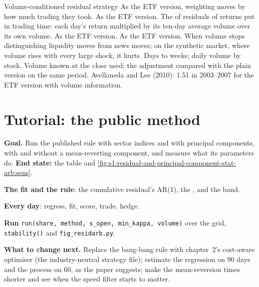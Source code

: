 \begin{strategyfile}{Volume-conditioned residual strategy}\label{strat:s1:residual-and-principal-component-stat-arb:volume}
 As the ETF version, weighting moves by how much trading they took.
 As the ETF version.
 The  of residuals of returns put in trading time: each day's return multiplied by its ten-day average volume over its own volume.
 As the ETF version.
 As the ETF version.
 When volume stops distinguishing liquidity moves from news moves; on the synthetic market, where volume rises with every large shock,
it hurts.
 Days to weeks; daily volume by stock.
 Volume known at the close used; the adjustment compared with the plain version on the same period.
 Avellaneda and Lee (2010): 1.51 in 2003--2007 for the ETF version with volume information.
\end{strategyfile}

\section{Tutorial: the public method}\label{tut:s1:residual-and-principal-component-stat-arb:tut}

\begin{tutorial}
\textbf{Goal.} Run the published rule with sector indices and with principal components, with and without a mean-reverting component, and measure what its
parameters do. \textbf{End state:} the table and \cref{fig:s1:residual-and-principal-component-stat-arb:sens}.
\begin{tutsteps}
\item \textbf{The fit and the rule}: the cumulative residual's AR(1), the , and the band.
\label{lst:s1:residual-and-principal-component-stat-arb:fit}
\item \textbf{Every day}: regress, fit, score, trade, hedge.
\label{lst:s1:residual-and-principal-component-stat-arb:loop}
\item \textbf{Run} \texttt{run(share, method, s\_open, min\_kappa, volume)} over the grid, \texttt{stability()} and \texttt{fig\_residarb.py}.
\end{tutsteps}
\textbf{What to change next.} Replace the bang-bang rule with chapter~2's cost-aware optimiser (the industry-neutral strategy file); estimate the regression
on 90 days and the process on 60, as the paper suggests; make the mean-reversion times shorter and see when the speed filter starts to matter.
\end{tutorial}

